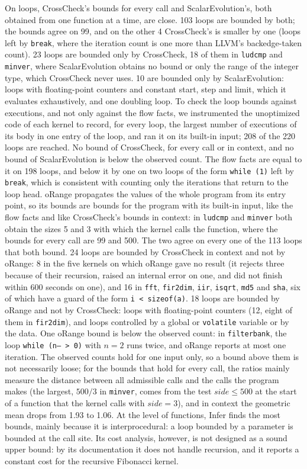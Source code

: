 \documentclass[oneside,english]{amsart}
\numberwithin{equation}{section}
\numberwithin{figure}{section}
\theoremstyle{plain}
\theoremstyle{definition}
\theoremstyle{plain}
\theoremstyle{remark}
\theoremstyle{plain}
\theoremstyle{definition}
\theoremstyle{plain}
\theoremstyle{remark}
\begin{document}
On loops, CrossCheck's bounds for every call and ScalarEvolution's, both obtained from one function at a time, are close. 103 loops are bounded by both; the bounds agree on 99, and on the other 4 CrossCheck's is smaller by one (loops left by \texttt{break}, where the iteration count is one more than LLVM's backedge-taken count). 23 loops are bounded only by CrossCheck, 18 of them in \texttt{ludcmp} and \texttt{minver}, where ScalarEvolution obtains no bound or only the range of the integer type, which CrossCheck never uses. 10 are bounded only by ScalarEvolution: loops with floating-point counters and constant start, step and limit, which it evaluates exhaustively, and one doubling loop. To check the loop bounds against executions, and not only against the flow facts, we instrumented the unoptimized code of each kernel to record, for every loop, the largest number of executions of its body in one entry of the loop, and ran it on its built-in input; 208 of the 220 loops are reached. No bound of CrossCheck, for every call or in context, and no bound of ScalarEvolution is below the observed count. The flow facts are equal to it on 198 loops, and below it by one on two loops of the form \texttt{while (1)} left by \texttt{break}, which is consistent with counting only the iterations that return to the loop head. oRange propagates the values of the whole program from its entry point, so its bounds are bounds for the program with its built-in input, like the flow facts and like CrossCheck's bounds in context: in \texttt{ludcmp} and \texttt{minver} both obtain the sizes 5 and 3 with which the kernel calls the function, where the bounds for every call are 99 and 500. The two agree on every one of the 113 loops that both bound. 24 loops are bounded by CrossCheck in context and not by oRange: 8 in the five kernels on which oRange gave no result (it rejects three because of their recursion, raised an internal error on one, and did not finish within 600 seconds on one), and 16 in \texttt{fft}, \texttt{fir2dim}, \texttt{iir}, \texttt{isqrt}, \texttt{md5} and \texttt{sha}, six of which have a guard of the form \texttt{i < sizeof(a)}. 18 loops are bounded by oRange and not by CrossCheck: loops with floating-point counters (12, eight of them in \texttt{fir2dim}), and loops controlled by a global or \texttt{volatile} variable or by the data. One oRange bound is below the observed count: in \texttt{filterbank}, the loop \texttt{while (n-- > 0)} with $n = 2$ runs twice, and oRange reports at most one iteration. The observed counts hold for one input only, so a bound above them is not necessarily loose; for the bounds that hold for every call, the ratios mainly measure the distance between all admissible calls and the calls the program makes (the largest, $500/3$ in \texttt{minver}, comes from the test $\mathit{side} \le 500$ at the start of a function that the kernel calls with $\mathit{side} = 3$), and in context the geometric mean drops from 1.93 to 1.06. At the level of functions, Infer finds the most bounds, mainly because it is interprocedural: a loop bounded by a parameter is bounded at the call site. Its cost analysis, however, is not designed as a sound upper bound: by its documentation it does not handle recursion, and it reports a constant cost for the recursive Fibonacci kernel. 
\end{document}
